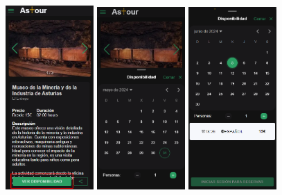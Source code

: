 \begin{enumerate}
	      \begin{figure}[H]
		      \centering
		      \includegraphics[width=0.3\textwidth]{7-Construccion/Manuales/mobile/ver disponibilidad.png}
		      \includegraphics[width=0.3\textwidth]{7-Construccion/Manuales/mobile/disponibilidad.png}
		      \includegraphics[width=0.3\textwidth]{7-Construccion/Manuales/mobile/fecha seleccionada.png}

\end{figure}
\end{enumerate}
